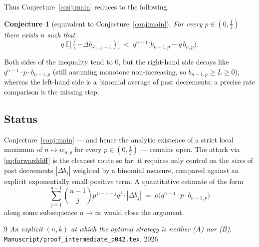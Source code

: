 \documentclass{article}
\newtheorem{conjecture}[proposition]{Conjecture}
\theoremstyle{definition}
\theoremstyle{remark}
\begin{document}
Thus Conjecture~\ref{conj:main} reduces to the following.

\begin{conjecture}[equivalent to Conjecture~\ref{conj:main}]\label{conj:equiv}
For every $p\in(0,\tfrac12)$ there exists $n$ such that
\[
  q\,\mathbb E\bigl[(-\Delta b_{J_{n-1}+1})\bigr]
  \;<\;q^{n-1}\bigl(b_{n-1,p}-q\,b_{n,p}\bigr).
\]
\end{conjecture}

Both sides of the inequality tend to $0$, but the right-hand side decays
like $q^{n-1}\cdot p\cdot b_{n-1,p}$ (still assuming monotone
non-increasing, so $b_{n-1,p}\ge L\ge 0$), whereas the left-hand side is
a binomial average of past decrements; a precise rate comparison is the
missing step.

\subsection*{Status}

Conjecture~\ref{conj:main} — and hence the analytic existence of a
strict local maximum of $n\mapsto w_{n,p}$ for every $p\in(0,\tfrac12)$
— remains open. The attack via \eqref{eq:forwarddiff} is the cleanest
route so far: it requires only control on the \emph{sizes} of past
decrements $|\Delta b_{j}|$ weighted by a binomial measure, compared
against an explicit exponentially small positive term. A quantitative
estimate of the form
\[
  \sum_{j=1}^{n-1}\binom{n-1}{j}p^{\,n-1-j}q^{j}\cdot|\Delta b_{j}|
  \;=\;o\bigl(q^{n-1}\cdot p\cdot b_{n-1,p}\bigr)
\]
along some subsequence $n\to\infty$ would close the argument.

\begin{thebibliography}{9}
\emph{An explicit $(n,k)$ at which the optimal strategy is neither (A) nor (B)},
  \texttt{Manuscript/proof\_intermediate\_p042.tex}, 2026.
\end{thebibliography}
\end{document}
